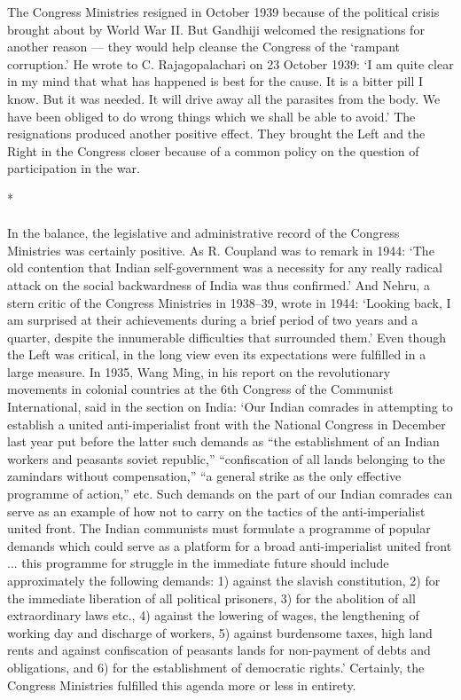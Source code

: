 \begin{multicols}{2}
The Congress Ministries resigned in October 1939 because of the political crisis brought about by World War II. But Gandhiji welcomed the resignations for another reason --- they would help cleanse the Congress of the `rampant corruption.' He wrote to C. Rajagopalachari on 23 October 1939: `I am quite clear in my mind that what has happened is best for the cause. It is a bitter pill I know. But it was needed. It will drive away all the parasites from the body. We have been obliged to do wrong things which we shall be able to avoid.' The resignations produced another positive effect. They brought the Left and the Right in the Congress closer because of a common policy on the question of participation in the war.

\begin{center}*\end{center}

\paragraph*{}
In the balance, the legislative and administrative record of the Congress Ministries was certainly positive. As R. Coupland was to remark in 1944: `The old contention that Indian self-government was a necessity for any really radical attack on the social backwardness of India was thus confirmed.' And Nehru, a stern critic of the Congress Ministries in 1938--39, wrote in 1944: `Looking back, I am surprised at their achievements during a brief period of two years and a quarter, despite the innumerable difficulties that surrounded them.' Even though the Left was critical, in the long view even its expectations were fulfilled in a large measure. In 1935, Wang Ming, in his report on the revolutionary movements in colonial countries at the 6th Congress of the Communist International, said in the section on India: `Our Indian comrades in attempting to establish a united anti-imperialist front with the National Congress in December last year put before the latter such demands as ``the establishment of an Indian workers and peasants soviet republic,'' ``confiscation of all lands belonging to the zamindars without compensation,'' ``a general strike as the only effective programme of action,'' etc. Such demands on the part of our Indian comrades can serve as an example of how not to carry on the tactics of the anti-imperialist united front. The Indian communists must formulate a programme of popular demands which could serve as a platform for a broad anti-imperialist united front ... this programme for struggle in the immediate future should include approximately the following demands: 1) against the slavish constitution, 2) for the immediate liberation of all political prisoners, 3) for the abolition of all extraordinary laws etc., 4) against the lowering of wages, the lengthening of working day and discharge of workers, 5) against burdensome taxes, high land rents and against confiscation of peasants lands for non-payment of debts and obligations, and 6) for the establishment of democratic rights.' Certainly, the Congress Ministries fulfilled this agenda more or less in entirety.


\end{multicols}
